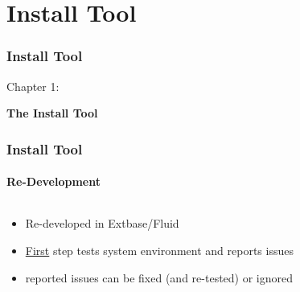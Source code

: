
\section{Install Tool}
\begin{frame}[fragile]
	\frametitle{Install Tool}

	\begin{center}\huge{Chapter 1:}\end{center}
	\begin{center}\huge{\color{typo3darkgrey}\textbf{The Install Tool}}\end{center}

\end{frame}


\begin{frame}[fragile]
	\frametitle{Install Tool}
	\framesubtitle{Re-Development}

	\begin{columns}[T]

		\begin{column}{.5\textwidth}
			\begin{itemize}
				\item Re-developed in Extbase/Fluid
				\item \underline{First} step tests system environment and reports issues
				\item reported issues can be fixed\newline
					(and re-tested) or ignored
			\end{itemize}
		\end{column}

		\begin{column}{.5\textwidth}
		\end{column}

	\end{columns}

\end{frame}


